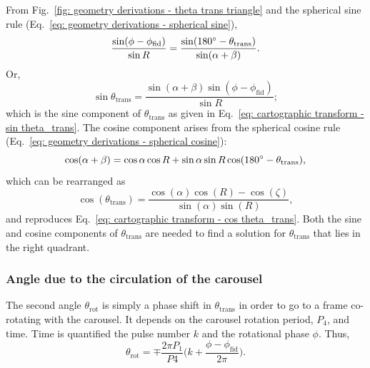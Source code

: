 From Fig.~\ref{fig: geometry derivations - theta trans triangle} and the spherical sine rule (Eq.~\eqref{eq: geometry derivations - spherical sine}),
\begin{equation}
    \label{eq: sthetatrans1}
	\frac{\sin(\phi-\phi_\mathrm{fid})}{\sin R} = \frac{\sin (180^\circ - \theta_\mathrm{trans})}{\sin (\alpha + \beta)}.
\end{equation}
Or,
\begin{equation}
    \label{eq: sthetatrans2}
	\sin\theta_\mathrm{trans} = \frac{\sin(\alpha + \beta) \sin(\phi-\phi_\mathrm{fid})}{\sin R};
\end{equation}
which is the sine component of $\theta_\mathrm{trans}$ as given in Eq.~\eqref{eq: cartographic transform - sin theta_trans}. The cosine component arises from the spherical cosine rule (Eq.~\eqref{eq: geometry derivations - spherical cosine}):
\begin{equation}
    \label{eq: cthetatrans1}
    \cos (\alpha + \beta) = \cos \alpha \cos R + \sin \alpha \sin R \cos (180^\circ - \theta_\mathrm{trans}),
\end{equation}
which can be rearranged as
\begin{equation}
    \label{eq: cthetatrans2}
    \cos(\theta_\mathrm{trans}) = \frac{\cos(\alpha)\cos(R) - \cos(\zeta)}{\sin(\alpha)\sin(R)},
\end{equation}
and reproduces Eq.~\eqref{eq: cartographic transform - cos theta_trans}. Both the sine and cosine components of $\theta_\mathrm{trans}$ are needed to find a solution for $\theta_\mathrm{trans}$ that lies in the right quadrant.







\subsubsection{Angle due to the circulation of the carousel}
\label{app: geometry derivations - cartographic transforms - derivation of Theta - theta rot}

The second angle $\theta_\mathrm{rot}$ is simply a phase shift in $\theta_\mathrm{trans}$ in order to go to a frame co-rotating with the carousel. It depends on the carousel rotation period, $P_4$, and time. Time is quantified the pulse number $k$ and the rotational phase $\phi$. Thus,
\begin{equation}
    \label{eq: thetarot}
	\theta_\mathrm{rot} = \mp \frac{2\pi P_1}{P4}\bigg( k + \frac{\phi - \phi_\mathrm{fid}}{2\pi}\bigg).
\end{equation}

